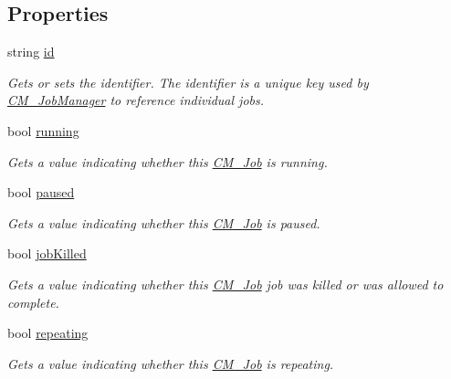 \subsection*{Properties}
\begin{DoxyCompactItemize}
\item 
string \hyperlink{class_c_m___job_a19b93ec8fb1f643db06e79ad0710732b}{id}
\begin{DoxyCompactList}\small\item\em Gets or sets the identifier. The identifier is a unique key used by \hyperlink{class_c_m___job_manager}{C\+M\+\_\+\+Job\+Manager} to reference individual jobs. \end{DoxyCompactList}\item 
bool \hyperlink{class_c_m___job_a2226fbaee0c831d28fde43ffe0a58f70}{running}
\begin{DoxyCompactList}\small\item\em Gets a value indicating whether this \hyperlink{class_c_m___job}{C\+M\+\_\+\+Job} is running. \end{DoxyCompactList}\item 
bool \hyperlink{class_c_m___job_a4d7d6001f3d1153d50f83490fe426925}{paused}
\begin{DoxyCompactList}\small\item\em Gets a value indicating whether this \hyperlink{class_c_m___job}{C\+M\+\_\+\+Job} is paused. \end{DoxyCompactList}\item 
bool \hyperlink{class_c_m___job_aa15b9e9cead89bfbd449e0194dc30751}{job\+Killed}
\begin{DoxyCompactList}\small\item\em Gets a value indicating whether this \hyperlink{class_c_m___job}{C\+M\+\_\+\+Job} job was killed or was allowed to complete. \end{DoxyCompactList}\item 
bool \hyperlink{class_c_m___job_ab18400e9cdb983c298d92c6e28acc599}{repeating}
\begin{DoxyCompactList}\small\item\em Gets a value indicating whether this \hyperlink{class_c_m___job}{C\+M\+\_\+\+Job} is repeating. \end{DoxyCompactList}\item 

\end{DoxyCompactItemize}
